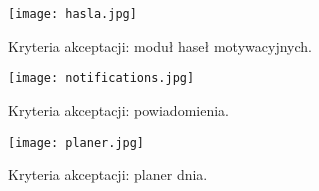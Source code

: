 \documentclass[12pt, letterpaper]{article}
\begin{document}
    \begin{figure}[h]
        \centering
        \texttt{[image: hasla.jpg]}
        \caption{Kryteria akceptacji: moduł haseł motywacyjnych.}
    \end{figure}

    \begin{figure}[h]
        \centering
        \texttt{[image: notifications.jpg]}
        \caption{Kryteria akceptacji: powiadomienia.}
    \end{figure}

    \begin{figure}[h]
        \centering
        \texttt{[image: planer.jpg]}
        \caption{Kryteria akceptacji: planer dnia.}
    \end{figure}
\end{document}
